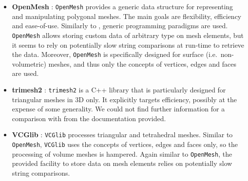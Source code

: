 \begin{itemize}
  \item \textbf{OpenMesh} \cite{OpenMesh}: \texttt{OpenMesh} provides a generic data structure for representing and manipulating polygonal meshes.
        The main goals are flexibility, efficiency and ease-of-use.
        Similarly to {\ViennaGrid}, generic programming paradigms are used.
        \texttt{OpenMesh} allows storing custom data of arbitrary type on mesh elements, but it seems to rely on potentially slow string comparisons at run-time to retrieve the data.
        Moreover, \texttt{OpenMesh} is specifically designed for surface (i.e.~non-volumetric) meshes, and thus only the concepts of vertices, edges and faces are used.

  \item \textbf{trimesh2} \cite{trimesh2}: \texttt{trimesh2} is a C++ library that is particularly designed for triangular meshes in 3D only.
        It explicitly targets efficiency, possibly at the expense of some generality.
        We could not find further information for a comparison with {\ViennaGrid} from the documentation provided.

  \item \textbf{VCGlib} \cite{VCGlib}: \texttt{VCGlib} processes triangular and tetrahedral meshes.
        Similar to \texttt{OpenMesh}, \texttt{VCGlib} uses the concepts of vertices, edges and faces only, so the processing of volume meshes is hampered.
        Again similar to \texttt{OpenMesh}, the provided facility to store data on mesh elements relies on potentially slow string comparisons.
\end{itemize}




